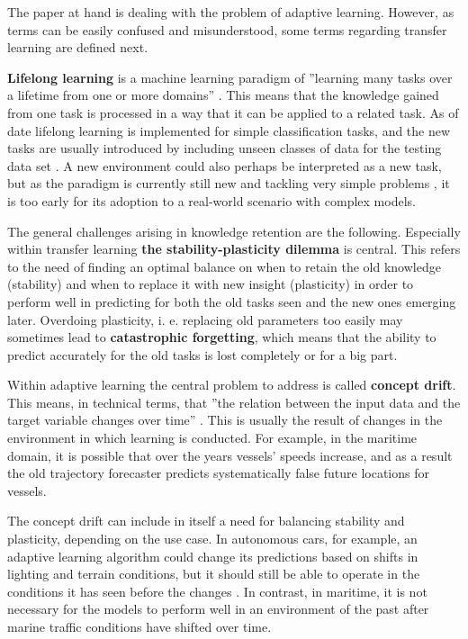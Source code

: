 The paper at hand is dealing with the problem of adaptive learning. However, as terms can be easily confused and misunderstood, some terms regarding transfer learning are defined next.

\textbf{Lifelong learning} is a machine learning paradigm of ''learning many tasks over a lifetime from one or more domains'' \cite{lmlsystems}. This means that the knowledge gained from one task is processed in a way that it can be applied to a related task. As of date lifelong learning is implemented for simple classification tasks, and the new tasks are usually introduced by including unseen classes of data for the testing data set \cite{lmlinneuralnets}. A new environment could also perhaps be interpreted as a new task, but as the paradigm is currently still new and tackling very simple problems \cite{lmlinneuralnets}, it is too early for its adoption to a real-world scenario with complex models.

The general challenges arising in knowledge retention are the following. Especially within transfer learning \textbf{the stability-plasticity dilemma} is central. This refers to the need of finding an optimal balance on when to retain the old knowledge (stability) and when to replace it with new insight (plasticity) in order to perform well in predicting for both the old tasks seen and the new ones emerging later. Overdoing plasticity, i. e. replacing old parameters too easily may sometimes lead to \textbf{catastrophic forgetting}, which means that the ability to predict accurately for the old tasks is lost completely or for a big part.

Within adaptive learning the central problem to address is called \textbf{concept drift}. This means, in technical terms, that ''the relation between the input data and the target variable changes over time'' \cite{conceptdriftsurvey}. This is usually the result of changes in the environment in which learning is conducted. For example, in the maritime domain, it is possible that over the years vessels' speeds increase, and as a result the old trajectory forecaster predicts systematically false future locations for vessels.

The concept drift can include in itself a need for balancing stability and plasticity, depending on the use case. In autonomous cars, for example, an adaptive learning algorithm could change its predictions based on shifts in lighting and terrain conditions, but it should still be able to operate in the conditions it has seen before the changes \cite{conceptdriftsurvey}. In contrast, in maritime, it is not necessary for the models to perform well in an environment of the past after marine traffic conditions have shifted over time.

